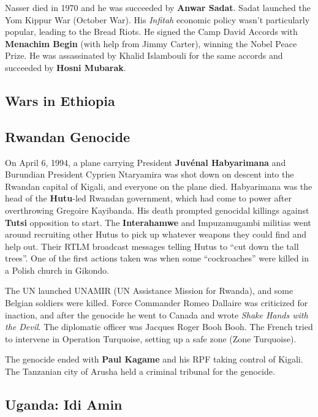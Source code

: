 Nasser died in 1970 and he was succeeded by \textbf{Anwar Sadat}.
Sadat launched the Yom Kippur War (October War).
His \textit{Infitah} economic policy wasn't particularly popular, leading to the Bread Riots.
He signed the Camp David Accords with \textbf{Menachim Begin} (with help from Jimmy Carter),
winning the Nobel Peace Prize.
He was assassinated by Khalid Islambouli for the same accords and succeeded by \textbf{Hosni Mubarak}.

\subsection*{Wars in Ethiopia}

\subsection*{Rwandan Genocide}

On April 6, 1994,
a plane carrying President \textbf{Juv\'enal Habyarimana} and Burundian President Cyprien Ntaryamira
was shot down on descent into the Rwandan capital of Kigali, and everyone on the plane died.
Habyarimana was the head of the \textbf{Hutu}-led Rwandan government,
which had come to power after overthrowing Gregoire Kayibanda.
His death prompted genocidal killings against \textbf{Tutsi} opposition to start.
The \textbf{Interahamwe} and Impuzamugambi militias
went around recruiting other Hutus to pick up whatever weapons they could find and help out.
Their RTLM broadcast messages telling Hutus to ``cut down the tall trees''.
One of the first actions taken was when some ``cockroaches'' were killed in a Polish church in Gikondo.

The UN launched UNAMIR (UN Assistance Mission for Rwanda), and some Belgian soldiers were killed.
Force Commander Romeo Dallaire was criticized for inaction,
and after the genocide he went to Canada and wrote \textit{Shake Hands with the Devil}.
The diplomatic officer was Jacques Roger Booh Booh.
The French tried to intervene in Operation Turquoise, setting up a safe zone (Zone Turquoise).

The genocide ended with \textbf{Paul Kagame} and his RPF taking control of Kigali.
The Tanzanian city of Arusha held a criminal tribunal for the genocide.

\subsection*{Uganda: Idi Amin}

